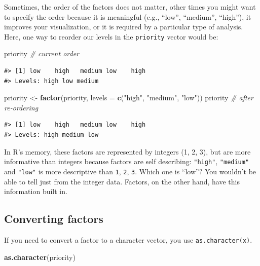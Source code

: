 \documentclass[
]{book}
\newenvironment{Shaded}{\begin{snugshade}}{\end{snugshade}}
\newcommand{\AttributeTok}[1]{\textcolor[rgb]{0.13,0.29,0.53}{#1}}
\newcommand{\CommentTok}[1]{\textcolor[rgb]{0.56,0.35,0.01}{\textit{#1}}}
\newcommand{\FunctionTok}[1]{\textcolor[rgb]{0.13,0.29,0.53}{\textbf{#1}}}
\newcommand{\NormalTok}[1]{#1}
\newcommand{\OtherTok}[1]{\textcolor[rgb]{0.56,0.35,0.01}{#1}}
\newcommand{\StringTok}[1]{\textcolor[rgb]{0.31,0.60,0.02}{#1}}
\begin{document}
Sometimes, the order of the factors does not matter, other times you might want
to specify the order because it is meaningful (e.g., ``low'', ``medium'', ``high''),
it improves your visualization, or it is required by a particular type of
analysis. Here, one way to reorder our levels in the \texttt{priority} vector would be:

\begin{Shaded}
\begin{Highlighting}[]
\NormalTok{priority }\CommentTok{\# current order}
\end{Highlighting}
\end{Shaded}

\begin{verbatim}
#> [1] low    high   medium low    high  
#> Levels: high low medium
\end{verbatim}

\begin{Shaded}
\begin{Highlighting}[]
\NormalTok{priority }\OtherTok{\textless{}{-}} \FunctionTok{factor}\NormalTok{(priority, }\AttributeTok{levels =} \FunctionTok{c}\NormalTok{(}\StringTok{"high"}\NormalTok{, }\StringTok{"medium"}\NormalTok{, }\StringTok{"low"}\NormalTok{))}
\NormalTok{priority }\CommentTok{\# after re{-}ordering}
\end{Highlighting}
\end{Shaded}

\begin{verbatim}
#> [1] low    high   medium low    high  
#> Levels: high medium low
\end{verbatim}

In R's memory, these factors are represented by integers (1, 2, 3), but are more
informative than integers because factors are self describing: \texttt{"high"},
\texttt{"medium"} and \texttt{"low"} is more descriptive than \texttt{1}, \texttt{2}, \texttt{3}. Which one is ``low''? You wouldn't
be able to tell just from the integer data. Factors, on the other hand, have
this information built in.

\hypertarget{converting-factors}{%
\subsection{Converting factors}\label{converting-factors}}

If you need to convert a factor to a character vector, you use
\texttt{as.character(x)}.

\begin{Shaded}
\begin{Highlighting}[]
\FunctionTok{as.character}\NormalTok{(priority)}
\end{Highlighting}
\end{Shaded}
\end{document}
